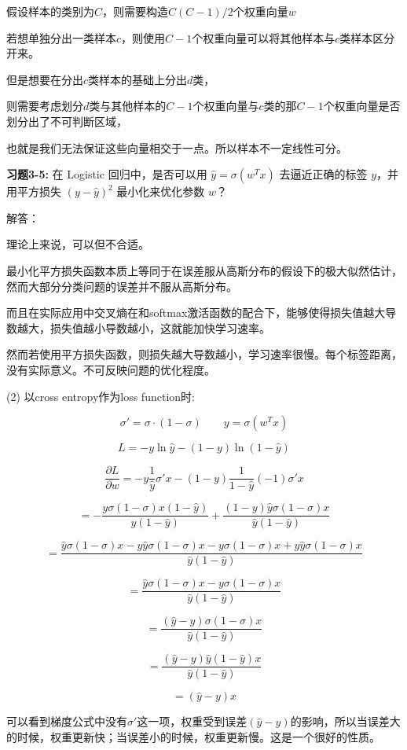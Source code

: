 假设样本的类别为$C$，则需要构造$C(C-1)/2$个权重向量$w$

若想单独分出一类样本$c$，则使用$C-1$个权重向量可以将其他样本与$c$类样本区分开来。

但是想要在分出$c$类样本的基础上分出$d$类，

则需要考虑划分$d$类与其他样本的$C-1$个权重向量与$c$类的那$C-1$个权重向量是否划分出了不可判断区域，

也就是我们无法保证这些向量相交于一点。所以样本不一定线性可分。


\noindent\textbf{习题3-5:} 在 Logistic 回归中，是否可以用 $\hat{y} = \sigma(w^Tx)$ 去逼近正确的标签 $y$，并用平方损失 $(y - \hat{y})^2$ 最小化来优化参数 $w$？

解答：

理论上来说，可以但不合适。

最小化平方损失函数本质上等同于在误差服从高斯分布的假设下的极大似然估计，然而大部分分类问题的误差并不服从高斯分布。

而且在实际应用中交叉熵在和softmax激活函数的配合下，能够使得损失值越大导数越大，损失值越小导数越小，这就能加快学习速率。

然而若使用平方损失函数，则损失越大导数越小，学习速率很慢。每个标签距离，没有实际意义。不可反映问题的优化程度。

(2) 以cross entropy作为loss function时:

\[\sigma'=\sigma\cdot(1-\sigma) \qquad y=\sigma(w^Tx)\]

\[L=-y\ln \hat{y}-(1-y)\ln(1-\hat{y})\]

\[\frac{\partial L}{\partial w}=-y\frac{1}{\hat{y}}\sigma'x-(1-y)\frac{1}{1-\hat{y}}(-1)\sigma'x\]

\[=-\frac{y\sigma(1-\sigma)x(1-\hat{y})}{\hat{y}(1-\hat{y})}+\frac{(1-y)\hat{y}\sigma(1-\sigma)x}{\hat{y}(1-\hat{y})}\]

\[=\frac{\hat{y}\sigma(1-\sigma)x-y\hat{y}\sigma(1-\sigma)x-y\sigma(1-\sigma)x+y\hat{y}\sigma(1-\sigma)x}{\hat{y}(1-\hat{y})}\]

\[=\frac{\hat{y}\sigma(1-\sigma)x-y\sigma(1-\sigma)x}{\hat{y}(1-\hat{y})}\]

\[=\frac{(\hat{y}-y)\sigma(1-\sigma)x}{\hat{y}(1-\hat{y})}\]

\[=\frac{(\hat{y}-y)\hat{y}(1-\hat{y})x}{\hat{y}(1-\hat{y})}\]

\[=(\hat{y}-y)x\]

可以看到梯度公式中没有$\sigma'$这一项，权重受到误差$(\hat{y}-y)$的影响，所以当误差大的时候，权重更新快；当误差小的时候，权重更新慢。这是一个很好的性质。

